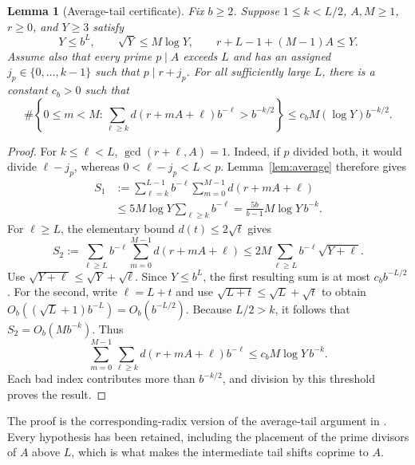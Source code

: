 \documentclass[11pt,a4paper]{article}
\newtheorem{lemma}[theorem]{Lemma}
\theoremstyle{definition}\newtheorem{definition}[theorem]{Definition}
\theoremstyle{remark}\newtheorem{remark}[theorem]{Remark}
\begin{document}
\begin{lemma}[Average-tail certificate]\label{lem:tail}
Fix $b\ge2$. Suppose $1\le k<L/2$, $A,M\ge1$, $r\ge0$, and $Y\ge3$ satisfy
\begin{equation}\label{eq:tailhyp}
 Y\le b^L,\qquad \sqrt Y\le M\log Y,\qquad
 r+L-1+(M-1)A\le Y.
\end{equation}
Assume also that every prime $p\mid A$ exceeds $L$ and has an assigned $j_p\in\{0,\ldots,k-1\}$ such that $p\mid r+j_p$. For all sufficiently large $L$, there is a constant $c_b>0$ such that
\[
 \#\left\{0\le m<M:\sum_{\ell\ge k}d(r+mA+\ell)b^{-\ell}>b^{-k/2}\right\}
 \le c_bM(\log Y)b^{-k/2}.
\]
\end{lemma}
\begin{proof}
For $k\le\ell<L$, $\gcd(r+\ell,A)=1$. Indeed, if $p$ divided both, it would divide $\ell-j_p$, whereas $0<\ell-j_p<L<p$. Lemma~\ref{lem:average} therefore gives
\begin{align*}
 S_1&:=\sum_{\ell=k}^{L-1}b^{-\ell}\sum_{m=0}^{M-1}d(r+mA+\ell)\\
 &\le5M\log Y\sum_{\ell\ge k}b^{-\ell}
 =\frac{5b}{b-1}M\log Y\,b^{-k}.
\end{align*}
For $\ell\ge L$, the elementary bound $d(t)\le2\sqrt t$ gives
\[
 S_2:=\sum_{\ell\ge L}b^{-\ell}\sum_{m=0}^{M-1}d(r+mA+\ell)
 \le2M\sum_{\ell\ge L}b^{-\ell}\sqrt{Y+\ell}.
\]
Use $\sqrt{Y+\ell}\le\sqrt Y+\sqrt\ell$. Since $Y\le b^L$, the first resulting sum is at most $c_b b^{-L/2}$. For the second, write $\ell=L+t$ and use $\sqrt{L+t}\le\sqrt L+\sqrt t$ to obtain $O_b((\sqrt L+1)b^{-L})=O_b(b^{-L/2})$. Because $L/2>k$, it follows that $S_2=O_b(Mb^{-k})$. Thus
\[
 \sum_{m=0}^{M-1}\sum_{\ell\ge k}d(r+mA+\ell)b^{-\ell}
 \le c_b M\log Y\,b^{-k}.
\]
Each bad index contributes more than $b^{-k/2}$, and division by this threshold proves the result.
\end{proof}

The proof is the corresponding-radix version of the average-tail argument in \cite{Campbell}. Every hypothesis has been retained, including the placement of the prime divisors of $A$ above $L$, which is what makes the intermediate tail shifts coprime to $A$.
\end{document}
